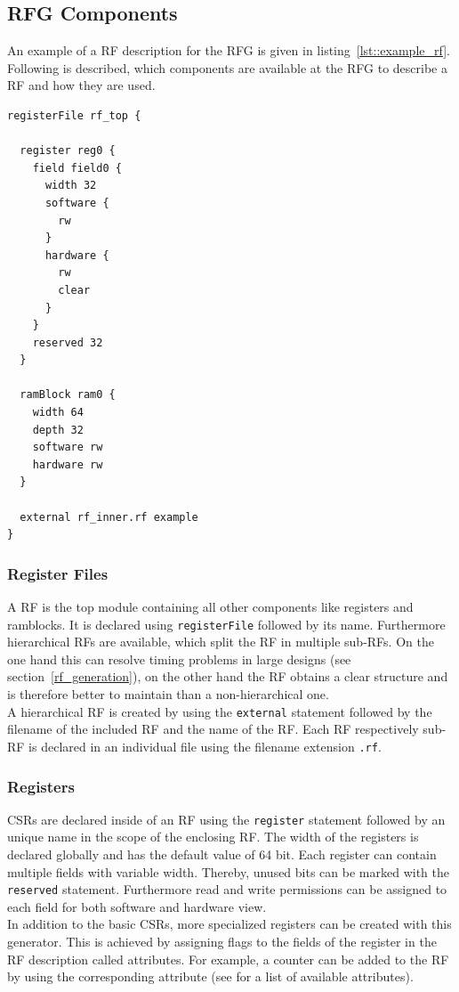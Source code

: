 \subsection{RFG Components}
An example of a RF description for the RFG is given in listing~\ref{lst::example_rf}. Following is described, which components are available at the RFG to describe a RF and how they are used.

\begin{lstlisting}[frame=single,
caption={Example RF description},
basicstyle=\small\ttfamily,
label={lst::example_rf}]
registerFile rf_top {

  register reg0 {
    field field0 {
      width 32
      software {
        rw
      }
      hardware {
        rw
        clear
      }
    }
    reserved 32
  }
	
  ramBlock ram0 {
    width 64
    depth 32
    software rw
    hardware rw
  }
	
  external rf_inner.rf example
}
\end{lstlisting}

\subsubsection{Register Files}
A RF is the top module containing all other components like registers and ramblocks. It is declared using \lstinline$registerFile$ followed by its name.
Furthermore hierarchical RFs are available, which split the RF in multiple sub-RFs. On the one hand this can resolve timing problems in large designs (see section~\ref{rf_generation}), on the other hand the RF obtains a clear structure and is therefore better to maintain than a non-hierarchical one.\\
A hierarchical RF is created by using the \lstinline$external$ statement followed by the filename of the included RF and the name of the RF. Each RF respectively sub-RF is declared in an individual file using the filename extension \lstinline$.rf$.
\subsubsection{Registers}
CSRs are declared inside of an RF using the \lstinline$register$ statement followed by an unique name in the scope of the enclosing RF. The width of the registers is declared globally and has the default value of 64 bit. Each register can contain multiple fields with variable width. Thereby, unused bits can be marked with the \lstinline$reserved$ statement. Furthermore read and write permissions can be assigned to each field for both software and hardware view.\\
In addition to the basic CSRs, more specialized registers can be created with this generator. This is achieved by assigning flags to the fields of the register in the RF description called attributes. For example, a counter can be added to the RF by using the corresponding attribute (see \cite{rfg_spec} for a list of available attributes).
